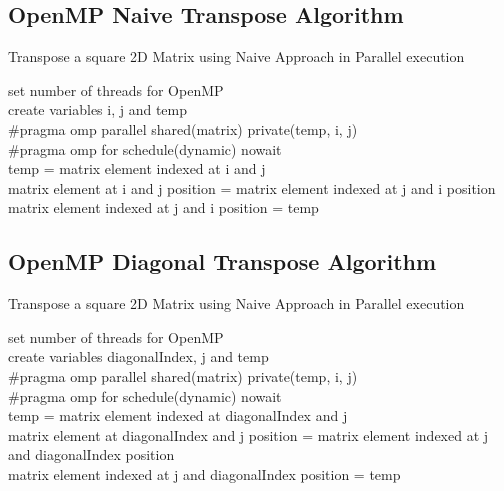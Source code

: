 \documentclass[10pt,onecolumn]{article}
\begin{document}
\subsection{OpenMP Naive Transpose Algorithm}
%
\begin{algorithm}[H]
    \caption{Transpose a square 2D Matrix using Naive Approach in Parallel execution}
    set number of threads for OpenMP\\
    create variables i, j and temp\\
    \#pragma omp parallel shared(matrix) private(temp, i, j)\\
    \#pragma omp for schedule(dynamic) nowait\\
    {
        {
            temp = matrix element indexed at i and j \\
            matrix element at i and j position = matrix element indexed at j and i position \\
            matrix element indexed at j and i position = temp
        }
    }
\end{algorithm}
%
\subsection{OpenMP Diagonal Transpose Algorithm}
%
\begin{algorithm}[H]
    \caption{Transpose a square 2D Matrix using Naive Approach in Parallel execution}
    set number of threads for OpenMP\\
    create variables diagonalIndex, j and temp\\
    \#pragma omp parallel shared(matrix) private(temp, i, j)\\
    \#pragma omp for schedule(dynamic) nowait\\
    {
        {
            temp = matrix element indexed at diagonalIndex and j \\
            matrix element at diagonalIndex and j position = matrix element indexed at j and diagonalIndex position \\
            matrix element indexed at j and diagonalIndex position = temp
        }
    }
\end{algorithm}
%
\end{document}
